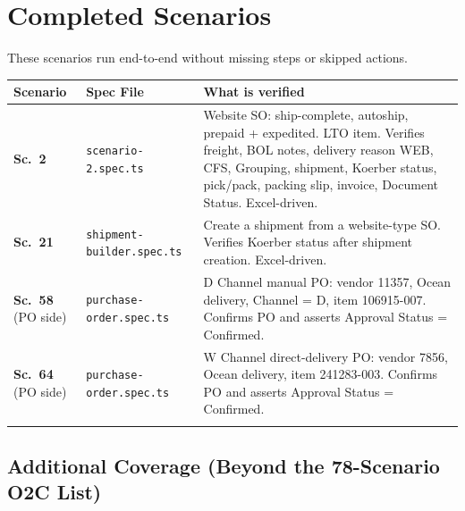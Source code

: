 \documentclass[a4paper,11pt]{article}
\begin{document}
\newpage

\section{Completed Scenarios}

\noindent These scenarios run end-to-end without missing steps or skipped actions.

\vspace{0.3cm}
\begin{longtable}{p{} p{} p{}}
\toprule
\textbf{Scenario} & \textbf{Spec File} & \textbf{What is verified} \\
\midrule
\endhead
\textbf{Sc.\ 2} & \texttt{scenario-2.spec.ts} &
Website SO: ship-complete, autoship, prepaid + expedited. LTO item. Verifies freight, BOL notes, delivery reason WEB, CFS, Grouping, shipment, Koerber status, pick/pack, packing slip, invoice, Document Status. Excel-driven. \\\relax
\cmidrule{1-3}
\textbf{Sc.\ 21} & \texttt{shipment-builder.spec.ts} &
Create a shipment from a website-type SO. Verifies Koerber status after shipment creation. Excel-driven. \\\relax
\cmidrule{1-3}
\textbf{Sc.\ 58} (PO side) & \texttt{purchase-order.spec.ts} &
D Channel manual PO: vendor 11357, Ocean delivery, Channel = D, item 106915-007. Confirms PO and asserts Approval Status = Confirmed. \\\relax
\cmidrule{1-3}
\textbf{Sc.\ 64} (PO side) & \texttt{purchase-order.spec.ts} &
W Channel direct-delivery PO: vendor 7856, Ocean delivery, item 241283-003. Confirms PO and asserts Approval Status = Confirmed. \\\relax
\cmidrule{1-3}
\bottomrule
\end{longtable}

\subsection{Additional Coverage (Beyond the 78-Scenario O2C List)}
\end{document}
